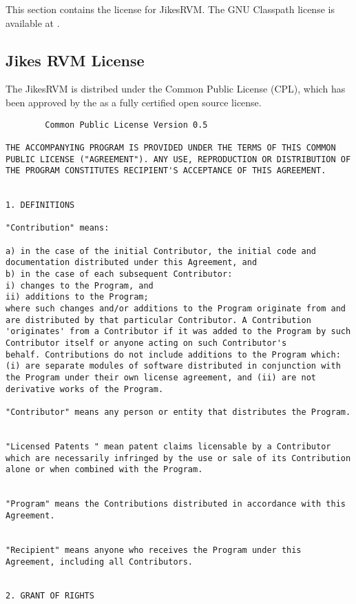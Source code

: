 This section contains the license for Jikes\trademark RVM.
The GNU Classpath license is available
at \xlink{{\tt \classpathURL}}{\classpathURL}.  


\subsection{Jikes RVM License}
The Jikes\trademark RVM is distribed under the Common Public License (CPL),
which has been approved by the 
as a fully certified open source license.


\begin{verbatim}
		Common Public License Version 0.5 

THE ACCOMPANYING PROGRAM IS PROVIDED UNDER THE TERMS OF THIS COMMON
PUBLIC LICENSE ("AGREEMENT"). ANY USE, REPRODUCTION OR DISTRIBUTION OF
THE PROGRAM CONSTITUTES RECIPIENT'S ACCEPTANCE OF THIS AGREEMENT.


1. DEFINITIONS 

"Contribution" means: 

a) in the case of the initial Contributor, the initial code and
documentation distributed under this Agreement, and  
b) in the case of each subsequent Contributor:
i) changes to the Program, and
ii) additions to the Program;
where such changes and/or additions to the Program originate from and
are distributed by that particular Contributor. A Contribution
'originates' from a Contributor if it was added to the Program by such
Contributor itself or anyone acting on such Contributor's
behalf. Contributions do not include additions to the Program which:
(i) are separate modules of software distributed in conjunction with
the Program under their own license agreement, and (ii) are not
derivative works of the Program. 

"Contributor" means any person or entity that distributes the Program. 


"Licensed Patents " mean patent claims licensable by a Contributor
which are necessarily infringed by the use or sale of its Contribution
alone or when combined with the Program.  


"Program" means the Contributions distributed in accordance with this
Agreement.  


"Recipient" means anyone who receives the Program under this
Agreement, including all Contributors.  


2. GRANT OF RIGHTS 


\end{verbatim}
